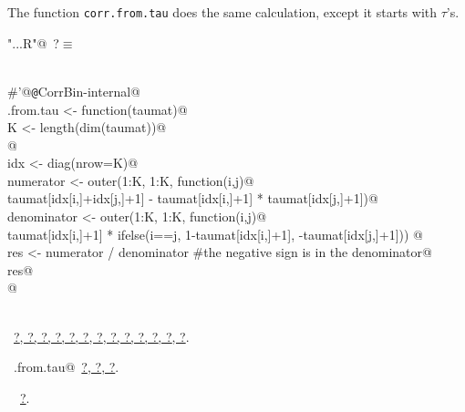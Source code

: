 \documentclass[reqno]{amsart}
\renewcommand{\NWtarget}[2]{\hypertarget{#1}{#2}}
\renewcommand{\NWlink}[2]{\hyperlink{#1}{#2}}
\begin{document}
The function \texttt{corr.from.tau} does the same calculation, except it starts with $\tau$'s. 
\begin{flushleft} \small\label{scrap41}\raggedright\small
\NWtarget{nuweb?}{} \verb@"..\R\ExchMultinomial.R"@\nobreak\ {\footnotesize {?}}$\equiv$
\vspace{-1ex}
\begin{list}{}{} \item
\mbox{}\verb@@\\
\mbox{}\verb@#'@{\tt @}\verb@rdname CorrBin-internal@\\
\mbox{}\verb@corr.from.tau <- function(taumat){@\\
\mbox{}\verb@  K <- length(dim(taumat))@\\
\mbox{}\verb@  @\\
\mbox{}\verb@  idx <- diag(nrow=K)@\\
\mbox{}\verb@  numerator <- outer(1:K, 1:K, function(i,j){@\\
\mbox{}\verb@     taumat[idx[i,]+idx[j,]+1] - taumat[idx[i,]+1] * taumat[idx[j,]+1]})@\\
\mbox{}\verb@  denominator <- outer(1:K, 1:K, function(i,j){@\\
\mbox{}\verb@     taumat[idx[i,]+1] * ifelse(i==j, 1-taumat[idx[i,]+1], -taumat[idx[j,]+1])})  @\\
\mbox{}\verb@  res <- numerator / denominator    #the negative sign is in the denominator@\\
\mbox{}\verb@  res@\\
\mbox{}\verb@}@\\
\mbox{}\verb@@\\
\mbox{}\verb@@{\NWsep}
\end{list}
\vspace{-1.5ex}
\footnotesize
\begin{list}{}{\setlength{\itemsep}{-\parsep}\setlength{\itemindent}{-\leftmargin}}
\item \NWtxtFileDefBy\ \NWlink{nuweb?}{?}\NWlink{nuweb?}{, ?}\NWlink{nuweb?}{, ?}\NWlink{nuweb?}{, ?}\NWlink{nuweb?}{, ?}\NWlink{nuweb?}{, ?}\NWlink{nuweb?}{, ?}\NWlink{nuweb?}{, ?}\NWlink{nuweb?}{, ?}\NWlink{nuweb?}{, ?}\NWlink{nuweb?}{, ?}\NWlink{nuweb?}{, ?}\NWlink{nuweb?}{, ?}.
\item \NWtxtIdentsDefed\nobreak\  \verb@corr.from.tau@\nobreak\ \NWlink{nuweb?}{?}\NWlink{nuweb?}{, ?}\NWlink{nuweb?}{, ?}.\item \NWtxtIdentsUsed\nobreak\  \verb@tau@\nobreak\ \NWlink{nuweb?}{?}.
\item{}
\end{list}
\vspace{4ex}
\end{flushleft}
\end{document}
